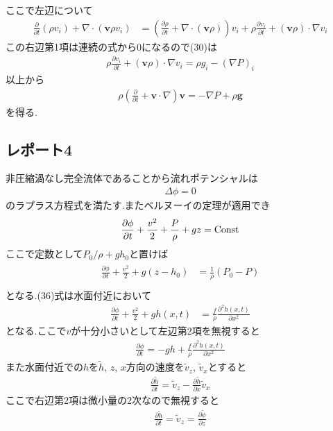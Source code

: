 \documentclass[uplatex,a4j,11pt,dvipdfmx]{jsarticle}
\begin{document}
ここで左辺について
\begin{align}
  \frac{\partial}{\partial t}(\rho v_i)+\nabla\cdot({\bm v}\rho v_i)&=
  \left(\frac{\partial \rho}{\partial t}+\nabla\cdot({\bm v}\rho)\right)v_i+\rho\frac{\partial v_i}{\partial t}+({\bm v}\rho)\cdot\nabla v_i
\end{align}
この右辺第1項は連続の式から0になるので(30)は
\begin{align}
  \rho\frac{\partial v_i}{\partial t}+({\bm v}\rho)\cdot\nabla v_i=\rho g_i-(\nabla P)_i
\end{align}
以上から
\begin{align}
  \rho\left(\frac{\partial}{\partial t}+{\bm v}\cdot\nabla\right){\bm v}=-\nabla P+\rho{\bm g}
\end{align}
を得る.
\subsection*{レポート4}
非圧縮渦なし完全流体であることから流れポテンシャルは
\begin{align}
  \Delta \phi=0
\end{align}
のラプラス方程式を満たす.またベルヌーイの定理が適用でき
\begin{align}
  \frac{\partial\phi}{\partial t}+\frac{v^2}{2}+\frac{P}{\rho}+gz={\rm Const}
\end{align}
ここで定数として$P_0/\rho+gh_0$と置けば
\begin{align}
  \begin{split}
    \frac{\partial\phi}{\partial t}+\frac{v^2}{2}+g(z-h_0)&=\frac{1}{\rho}(P_0-P)\\
  \end{split}
\end{align}
となる.(36)式は水面付近において
\begin{align}
  \frac{\partial\phi}{\partial t}+\frac{v^2}{2}+gh(x,t)&=\frac{f}{\rho}\frac{\partial^2 h(x,t)}{\partial x^2}
\end{align}
となる.ここで$v$が十分小さいとして左辺第2項を無視すると
\begin{align}
  \frac{\partial\phi}{\partial t}=-gh+\frac{f}{\rho}\frac{\partial^2 h(x,t)}{\partial x^2}
\end{align}
また水面付近での$h$を$\tilde{h}$, $z$, $x$方向の速度を$\tilde{v}_z$, $\tilde{v}_x$とすると
\begin{align}
  \frac{\partial\tilde{h}}{\partial t}=\tilde{v}_z-\frac{\partial\tilde{h}}{\partial x}\tilde{v}_x
\end{align}
ここで右辺第2項は微小量の2次なので無視すると
\begin{align}
  \frac{\partial\tilde{h}}{\partial t}=\tilde{v}_z=\frac{\partial\tilde{\phi}}{\partial z}
\end{align}

\end{document}
